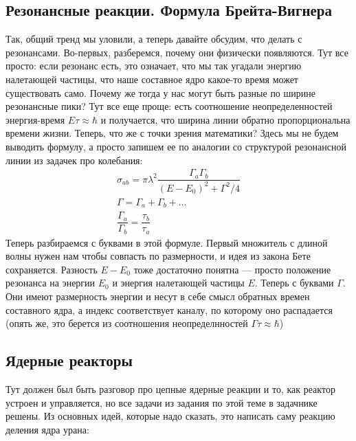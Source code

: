 \documentclass[12pt]{article}
\begin{document}
\subsection{Резонансные реакции. Формула Брейта-Вигнера}
Так, общий тренд мы уловили, а теперь давайте обсудим, что делать с резонансами. Во-первых, разберемся, почему они физически появляются. Тут все просто: если резонанс есть, это означает, что мы так угадали энергию налетающей частицы, что наше составное ядро какое-то время может существовать само. Почему же тогда у нас могут быть разные по ширине резонансные пики? Тут все еще проще: есть соотношение неопределенностей энергия-время $E\tau \approx \hbar$ и получается, что ширина линии обратно пропорциональна времени жизни. Теперь, что же с точки зрения математики? Здесь мы не будем выводить формулу, а просто запишем ее по аналогии со структурой резонансной линии из задачек про колебания:
\begin{gather*}
    \sigma_{ab} = \pi \lambda^2 \dfrac{\Gamma_a \Gamma_b}{(E-E_0)^2 + \Gamma^2/4}\\
    \Gamma = \Gamma_a + \Gamma_b + \dots\\
    \dfrac{\Gamma_a}{\Gamma_b}=\dfrac{\tau_b}{\tau_a}
\end{gather*}
Теперь разбираемся с буквами в этой формуле. Первый множитель с длиной волны нужен нам чтобы совпасть по размерности, и идея из закона Бете сохраняется. Разность $E-E_0$ тоже достаточно понятна --- просто положение резонанса на энергии $E_0$ и энергия налетающей частицы $E$. Теперь с буквами $\Gamma$. Они имеют размерность энергии и несут в себе смысл обратных времен составного ядра, а индекс соответствует каналу, по которому оно распадается (опять же, это берется из соотношения неопределнностей $\Gamma \tau \approx \hbar$) 

\subsection{Ядерные реакторы}
Тут должен был быть разговор про цепные ядерные реакции и то, как реактор устроен и управляется, но все задачи из задания по этой теме в задачнике решены. Из основных идей, которые надо сказать, это написать саму реакцию деления ядра урана:
\end{document}
